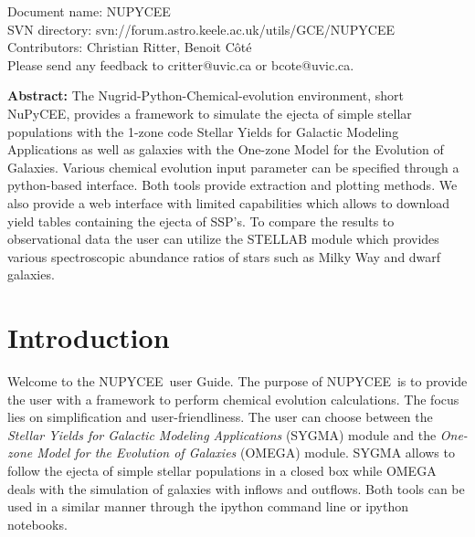 \renewcommand{\ndoctitle}{NUPYCEE} 
\renewcommand{\ndocname}{NUPYCEE}                      
\renewcommand{\svndir}{svn://forum.astro.keele.ac.uk/utils/GCE/NUPYCEE}  
\renewcommand{\ndoccontribs}{Christian Ritter, Benoit C\^ot\'e}

%

Document name: \ndocname \\
SVN directory: \svndir\\
Contributors: \ndoccontribs\\
Please send any feedback to critter@uvic.ca or bcote@uvic.ca.


{  \textbf{Abstract:} %
\noindent The Nugrid-Python-Chemical-evolution environment, short NuPyCEE, provides
a framework to simulate the ejecta of simple stellar populations with the 1-zone code
Stellar Yields for Galactic Modeling Applications as well as galaxies
with the One-zone Model for the Evolution of Galaxies.
Various chemical evolution input parameter can be specified through a python-based interface.
Both tools provide extraction and plotting methods.
We also provide a web interface with limited capabilities which allows to download
yield tables containing the ejecta of SSP's. 
To compare the results to observational data the user can utilize the STELLAB module
which provides various spectroscopic abundance ratios of stars such as
Milky Way and dwarf galaxies.
}



\section{Introduction}
\index{\ndocname}
Welcome to the \ndocname\ user Guide. The purpose of \ndocname\ is to 
provide the user with a framework to perform chemical evolution calculations.
The focus lies on simplification and user-friendliness.
The user can choose between the \textit{Stellar Yields for Galactic Modeling Applications} (SYGMA) module 
and the \textit{One-zone Model for the Evolution of Galaxies} (OMEGA) module.
SYGMA allows to follow the ejecta of simple stellar populations in a closed box while OMEGA deals with
the simulation of galaxies with inflows and outflows.
Both tools can be used in a similar manner through the ipython command line or
ipython notebooks.


